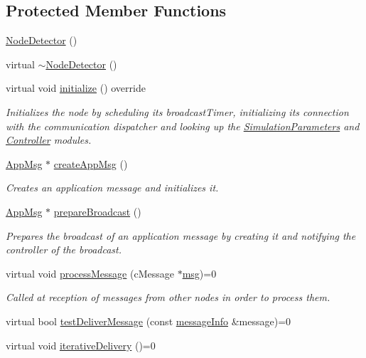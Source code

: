 \subsection*{Protected Member Functions}
\begin{DoxyCompactItemize}
\item 
\hyperlink{class_node_detector_a256160d034631f4fa14a83787f504aae}{Node\+Detector} ()
\item 
virtual \hyperlink{class_node_detector_a3f8e6eedfce05ea8953ff1a41413ccfa}{$\sim$\+Node\+Detector} ()
\item 
virtual void \hyperlink{class_node_detector_aefa188ab0657837b1b57f24674d3ef22}{initialize} () override
\begin{DoxyCompactList}\small\item\em Initializes the node by scheduling it\textquotesingle{}s broadcast\+Timer, initializing its connection with the communication dispatcher and looking up the \hyperlink{class_simulation_parameters}{Simulation\+Parameters} and \hyperlink{class_controller}{Controller} modules. \end{DoxyCompactList}\item 
\hyperlink{class_app_msg}{App\+Msg} $\ast$ \hyperlink{class_node_detector_a7100349647350ad5e3aeb1ed4669c723}{create\+App\+Msg} ()
\begin{DoxyCompactList}\small\item\em Creates an application message and initializes it. \end{DoxyCompactList}\item 
\hyperlink{class_app_msg}{App\+Msg} $\ast$ \hyperlink{class_node_detector_af75cf37cc01fc51bc228a7a83c10cb97}{prepare\+Broadcast} ()
\begin{DoxyCompactList}\small\item\em Prepares the broadcast of an application message by creating it and notifying the controller of the broadcast. \end{DoxyCompactList}\item 
virtual void \hyperlink{class_node_detector_ab69432c6d3327a684845ec231826727e}{process\+Message} (c\+Message $\ast$\hyperlink{_controller_8h_afa0f3b802fbc219228f7bb97996fa558}{msg})=0
\begin{DoxyCompactList}\small\item\em Called at reception of messages from other nodes in order to process them. \end{DoxyCompactList}\item 
virtual bool \hyperlink{class_node_detector_a51e7dccd54e94bbe937752ca39dfdba4}{test\+Deliver\+Message} (const \hyperlink{structures_8h_a7e7bdc1d2fff8a9436f2f352b2711ed6}{message\+Info} \&message)=0
\item 
virtual void \hyperlink{class_node_detector_a17ecf9939fce7471f4513b66185743cc}{iterative\+Delivery} ()=0
\end{DoxyCompactItemize}
